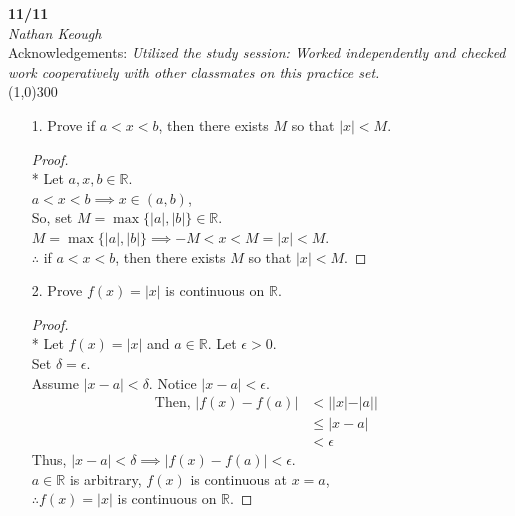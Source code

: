 \documentclass[a4paper]{article}
\newcommand{\eps}{\epsilon}
\newcommand{\del}{\delta}
\newcommand{\real}{\mathbb{R}}
\begin{document}
    \begin{center}
        \Large \textbf{11/11} \\
        \large \textit{Nathan Keough} \\
        Acknowledgements: \emph{Utilized the study session: Worked independently and checked work cooperatively with other classmates on this practice set.} \vspace{.5pc} \\ \line(1,0){300} 
        \vspace{1pc}
    \end{center} 
    
    \begin{flushleft}


        \begin{enumerate}
            \item [1.] Prove if $a<x<b$, then there exists $M$ so that $|x|<M$.
            
            \begin{proof}\mbox{}\\*
                Let $a,x,b\in \real$.\\
                $a<x<b \implies x\in (a,b)$, \\
                So, set $M = \max\{|a|, |b|\} \in \real$. \\
                $M = \max\{|a|, |b|\} \implies -M < x < M = |x| < M$. \\
                $\therefore$ if $a<x<b$, then there exists $M$ so that $|x|<M$.
            \end{proof}

            \item [2.] Prove $f(x)=|x|$ is continuous on $\real$.
            
            \begin{proof}\mbox{}\\*
                Let $f(x) = |x|$ and $a \in \real$. Let $\eps > 0$. \\
                Set $\del = \eps$. \\
                Assume $|x-a| < \del$. Notice $|x-a| < \eps$.
                \begin{align*}
                    \text{Then, }|f(x) - f(a)| &< ||x|-|a|| & \\
                                               &\leq |x-a| &\\ 
                                               &< \eps &
                \end{align*}
                Thus, $|x-a| < \del \implies |f(x) - f(a)| < \eps$. \\
                $a \in \real$ is arbitrary, $f(x)$ is continuous at $x=a$, \\
                $\therefore f(x)=|x|$ is continuous on $\real$.
            \end{proof}

        \end{enumerate} 

    \end{flushleft}
\end{document}
